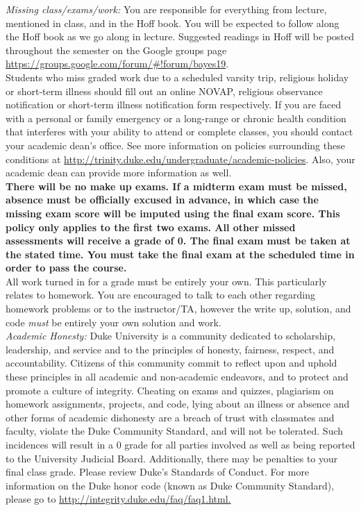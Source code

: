 \documentclass[11pt]{article}
\begin{document}
\emph{Missing class/exams/work:}
You are responsible for everything from lecture, mentioned in class, and in the Hoff book. You will be expected to follow along the Hoff book as we go along in lecture. Suggested readings in Hoff will be posted throughout the semester on the Google groups page \url{https://groups.google.com/forum/#!forum/bayes19}.  \\

Students who miss graded work due to a scheduled varsity trip, religious holiday or short-term illness should fill out an online NOVAP, religious observance notification or short-term illness notification form respectively. If you are faced with a personal or family emergency or a long-range or chronic health condition that interferes with your ability to attend or complete classes, you should contact your academic dean's office. See more information on policies surrounding these conditions at \url{http://trinity.duke.edu/undergraduate/academic-policies}. Also, your academic dean can provide more information as well.\\

\textbf{There will be no make up exams. If a midterm exam must be missed, absence must be officially excused in advance, in which case the missing exam score will be imputed using the final exam score. This policy only applies to the first \textbf{two} exams. All other missed assessments will receive a grade of 0. The final exam must be taken at the stated time. You must take the final exam at the scheduled time in order to pass the course.}\\

All work turned in for a grade must be entirely your own. This particularly relates to homework. You are encouraged to talk to each other regarding homework problems or to the instructor/TA, however the write up, solution, and code \emph{must} be entirely your own solution and work. \\


\emph{Academic Honesty:} Duke University is a community dedicated to scholarship, leadership, and service and to the principles of honesty, fairness, respect, and accountability. Citizens of this community commit to reflect upon and uphold these principles in all academic and non-academic endeavors, and to protect and promote a culture of integrity. Cheating on exams and quizzes, plagiarism on homework assignments, projects, and code, lying about an illness or absence and other forms of academic dishonesty are a breach of trust with classmates and faculty, violate the Duke Community Standard, and will not be tolerated. Such incidences will result in a 0 grade for all parties involved as well as being reported to the University Judicial Board. Additionally, there may be penalties to your final class grade. Please review Duke's Standards of Conduct.
For more information on the Duke honor code (known as Duke Community Standard), please go to \url{http://integrity.duke.edu/faq/faq1.html.}\\
\end{document}
